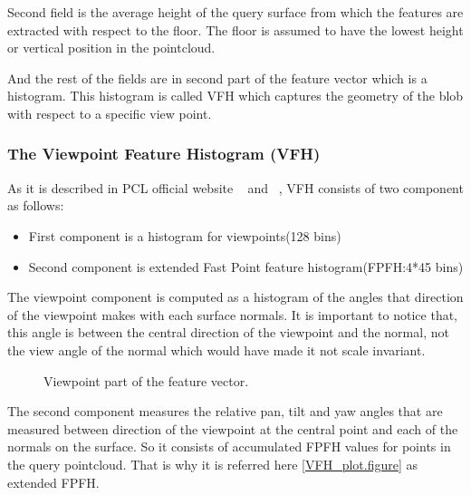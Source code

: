 Second field is the average height of the query surface from which the features are extracted with respect to the 
floor.
The floor is assumed to have the lowest height or vertical position in the pointcloud.
 
And the rest of the fields are in second part of the feature vector which is a histogram.
This histogram is called VFH which captures the geometry of the blob with respect to a specific view point. ~\cite{5651280}

\subsubsection*{The Viewpoint Feature Histogram (VFH)}
\label{VFH.ssec}

As it is described in PCL official website ~\cite{VFH_Definition} and ~\cite{5651280}, 
VFH consists of two component as follows:

\begin{itemize}
 \item First component is a histogram for viewpoints(128 bins)
 \item Second component is extended Fast Point feature histogram(FPFH:4*45 bins)
\end{itemize}

The viewpoint component is computed as a histogram of the angles that direction of the viewpoint  makes with each surface
normals. 
It is important to notice that, this angle is between the central direction of the viewpoint and the normal, not the view angle of
the normal which would have made it not scale invariant. 

\begin{figure}[t]
  \caption[ViewPoint Component of VFH]
  {Viewpoint part of the feature vector.\cite{VFH_Definition}}
  \label{VFH_ViewPoint_component.figure}
\end{figure}

The second component measures the relative pan, tilt and yaw angles that are measured between direction of 
the viewpoint at the central point and each of the normals on the surface. 
So it consists of accumulated FPFH values for points in the query pointcloud.
That is why it is referred here \ref{VFH_plot.figure} as extended FPFH.


